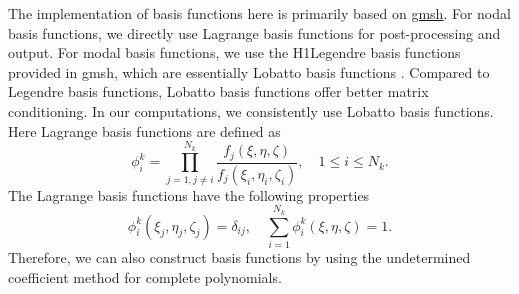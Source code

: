 \documentclass{develop-note}
\begin{document}
The implementation of basis functions here is primarily based on \href{https://gmsh.info}{gmsh}. For nodal basis functions, we directly use Lagrange basis functions for post-processing and output. For modal basis functions, we use the H1Legendre basis functions provided in gmsh, which are essentially Lobatto basis functions \cite{solinHigherOrderFiniteElement2003}. Compared to Legendre basis functions, Lobatto basis functions offer better matrix conditioning. In our computations, we consistently use Lobatto basis functions. Here Lagrange basis functions are defined as
\begin{equation}
  \phi_{i}^{k}=\prod_{j=1,j\neq i}^{N_{k}}\dfrac{f_{j}(\xi,\eta,\zeta)}{f_{j}(\xi_{i},\eta_{i},\zeta_{i})},\quad 1\leqslant i\leqslant N_{k}.
\end{equation}
The Lagrange basis functions have the following properties
\begin{equation}
  \phi_{i}^{k}(\xi_{j},\eta_{j},\zeta_{j})=\delta_{ij},\quad \sum_{i=1}^{N_{k}}\phi_{i}^{k}(\xi,\eta,\zeta)=1.
\end{equation}
Therefore, we can also construct basis functions by using the undetermined coefficient method for complete polynomials.







\end{document}
